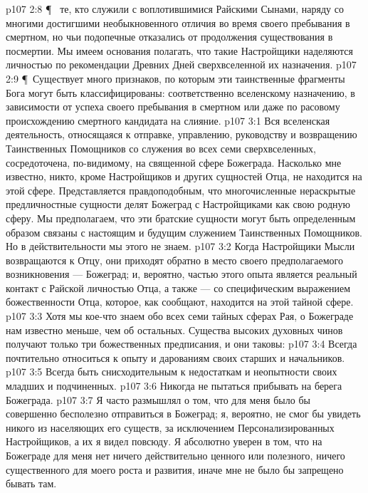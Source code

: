 \vs p107 2:8 \P\ \bibnobreakspace {} те, кто служили с воплотившимися Райскими Сынами, наряду со многими достигшими необыкновенного отличия во время своего пребывания в смертном, но чьи подопечные отказались от продолжения существования в посмертии. Мы имеем основания полагать, что такие Настройщики наделяются личностью по рекомендации Древних Дней сверхвселенной их назначения.
\vs p107 2:9 \P\ Существует много признаков, по которым эти таинственные фрагменты Бога могут быть классифицированы: соответственно вселенскому назначению, в зависимости от успеха своего пребывания в смертном или даже по расовому происхождению смертного кандидата на слияние.
\vs p107 3:1 Вся вселенская деятельность, относящаяся к отправке, управлению, руководству и возвращению Таинственных Помощников со служения во всех семи сверхвселенных, сосредоточена, по\hyp{}видимому, на священной сфере Божеграда. Насколько мне известно, никто, кроме Настройщиков и других сущностей Отца, не находится на этой сфере. Представляется правдоподобным, что многочисленные нераскрытые предличностные сущности делят Божеград с Настройщиками как свою родную сферу. Мы предполагаем, что эти братские сущности могут быть определенным образом связаны с настоящим и будущим служением Таинственных Помощников. Но в действительности мы этого не знаем.
\vs p107 3:2 Когда Настройщики Мысли возвращаются к Отцу, они приходят обратно в место своего предполагаемого возникновения --- Божеград; и, вероятно, частью этого опыта является реальный контакт с Райской личностью Отца, а также --- со специфическим выражением божественности Отца, которое, как сообщают, находится на этой тайной сфере.
\vs p107 3:3 Хотя мы кое\hyp{}что знаем обо всех семи тайных сферах Рая, о Божеграде нам известно меньше, чем об остальных. Существа высоких духовных чинов получают только три божественных предписания, и они таковы:
\vs p107 3:4 \bibnobreakspace Всегда почтительно относиться к опыту и дарованиям своих старших и начальников.
\vs p107 3:5 \bibnobreakspace Всегда быть снисходительным к недостаткам и неопытности своих младших и подчиненных.
\vs p107 3:6 \bibnobreakspace Никогда не пытаться прибывать на берега Божеграда.
\vs p107 3:7 Я часто размышлял о том, что для меня было бы совершенно бесполезно отправиться в Божеград; я, вероятно, не смог бы увидеть никого из населяющих его существ, за исключением Персонализированных Настройщиков, а их я видел повсюду. Я абсолютно уверен в том, что на Божеграде для меня нет ничего действительно ценного или полезного, ничего существенного для моего роста и развития, иначе мне не было бы запрещено бывать там.

